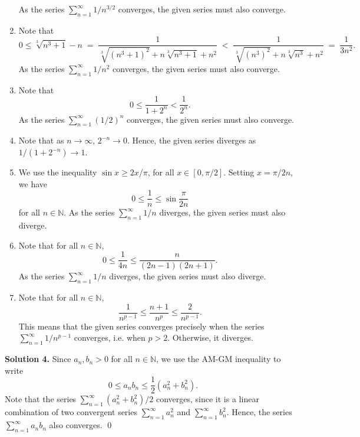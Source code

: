 \documentclass[10pt]{article}
\begin{document}
\begin{enumerate}
                        As the series $\sum_{n = 1}^\infty 1 /n^{3 /2}$ converges, the given series must also converge.
                \item Note that
                \[
                        0 \le \sqrt[3]{n^3 + 1} - n \;=\; \frac{1}{\sqrt[3]{(n^3 + 1)^2} + n\sqrt[3]{n^3 + 1} + n^2}
                        \;<\; \frac{1}{\sqrt[3]{(n^3)^2} + n\sqrt[3]{n^3} + n^2} \;=\; \frac{1}{3n^2}.
                \]
                        As the series $\sum_{n = 1}^\infty 1 /n^2$ converges, the given series must also converge.
                \item Note that
                \[
                        0 \le \frac{1}{1 + 2^n} < \frac{1}{2^n}.
                \]
                        As the series $\sum_{n = 1}^\infty (1 /2)^n$ converges, the given series must also converge.
                \item Note that as $n \to \infty$, $2^{-n} \to 0$. Hence, the given series diverges as $1 /(1 + 2^{-n})\to 1$.
                \item We use the inequality $\sin{x} \ge 2x/\pi$, for all $x \in [0, \pi/2]$. Setting $x = \pi/2n$,
                        we have \[0 \le \frac{1}{n} \le \sin \frac{\pi}{2n}\] for all $n \in \mathbb{N}$.
                        As the series $\sum_{n = 1}^\infty 1 /n$ diverges, the given series must also diverge.
                \item Note that for all $n \in \mathbb{N}$,
                \[
                        0\le \frac{1}{4n} \le \frac{n}{(2n - 1)(2n + 1)}.
                \]
                        As the series $\sum_{n = 1}^\infty 1 /n$ diverges, the given series must also diverge.
                \item Note that for all $n \in \mathbb{N}$,
                \[
                        \frac{1}{n^{p - 1}} \le \frac{n + 1}{n^p} \le \frac{2}{n^{p - 1}}.
                \]
                This means that the given series converges precisely when the series $\sum_{n = 1}^\infty 1 /n^{p - 1}$ converges,
                i.e. when $p > 2$. Otherwise, it diverges.
        \end{enumerate}

        \textbf{Solution 4.}
        Since $a_n, b_n > 0$ for all $n \in \mathbb{N}$, we use the AM-GM inequality to write
        \[
                0 \le a_n b_n \le \frac{1}{2}(a_n^2 + b_n^2).
        \]
        Note that the series $\sum_{n = 1}^\infty (a_n^2 + b_n^2)/ 2$ converges, since it is a linear combination of two convergent series
        $\sum_{n = 1}^\infty a_n^2$ and $\sum_{n = 1}^\infty b_n^2$. Hence, the series $\sum_{n = 1}^\infty a_n b_n$ also converges. \qed\\
        
\end{document}
